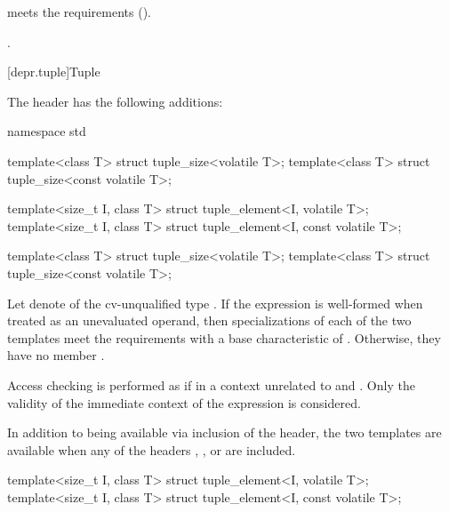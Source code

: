 \begin{itemdescr}
\pnum
\expects
{} meets the  requirements ().

\pnum
\returns
{}.
\end{itemdescr}

[depr.tuple]{Tuple}

\pnum
The header  has the following additions:

\begin{codeblock}
namespace std {
  template<class T> struct tuple_size<volatile T>;
  template<class T> struct tuple_size<const volatile T>;

  template<size_t I, class T> struct tuple_element<I, volatile T>;
  template<size_t I, class T> struct tuple_element<I, const volatile T>;
}
\end{codeblock}

\begin{itemdecl}
template<class T> struct tuple_size<volatile T>;
template<class T> struct tuple_size<const volatile T>;
\end{itemdecl}

\begin{itemdescr}
\pnum
Let  denote  of the cv-unqualified type .
If the expression  is well-formed
when treated as an unevaluated operand,
then specializations of each of the two templates meet
the  requirements with a base characteristic of
.
Otherwise, they have no member .

\pnum
Access checking is performed as if
in a context unrelated to  and .
Only the validity of the immediate context of the expression is considered.

\pnum
In addition to being available via inclusion of the  header,
the two templates are available when any of the headers
,
, or
are included.
\end{itemdescr}

\begin{itemdecl}
template<size_t I, class T> struct tuple_element<I, volatile T>;
template<size_t I, class T> struct tuple_element<I, const volatile T>;
\end{itemdecl}

